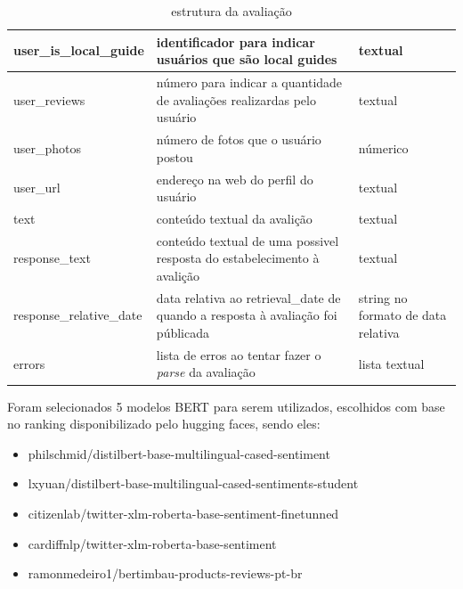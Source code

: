 \begin{table}[]
\begin{tabular}{|l|p{5cm}|p{5cm}|}
		\hline
		user\_is\_local\_guide    & identificador para indicar usuários que são local guides                        & textual                                                                        \\
		\hline
		user\_reviews             & número para indicar a quantidade de avaliações realizardas pelo usuário         & textual                                                                        \\
		\hline
		user\_photos              & número de fotos que o usuário postou                                            & númerico                                                                       \\
		\hline
		user\_url                 & endereço na web do perfil do usuário                                            & textual                                                                        \\
		\hline
		text                      & conteúdo textual da avalição                                                    & textual                                                                        \\
		\hline
		response\_text            & conteúdo textual de uma possivel resposta do estabelecimento à avalição         & textual                                                                        \\
		\hline
		response\_relative\_date  & data relativa ao retrieval\_date de quando a resposta à avaliação foi públicada & string no formato de data relativa                                             \\
		\hline
		errors                    & lista de erros ao tentar fazer o \emph{parse} da avaliação                      & lista textual                                                                  \\
		\hline
	\end{tabular}
	\caption{estrutura da avaliação}
	\label{tab:estrutura_review}
\end{table}

Foram selecionados 5 modelos BERT para serem utilizados, escolhidos com base no ranking disponibilizado pelo hugging faces, sendo eles:
\begin{itemize}
	\item philschmid/distilbert-base-multilingual-cased-sentiment
	\item lxyuan/distilbert-base-multilingual-cased-sentiments-student
	\item citizenlab/twitter-xlm-roberta-base-sentiment-finetunned
	\item cardiffnlp/twitter-xlm-roberta-base-sentiment
	\item ramonmedeiro1/bertimbau-products-reviews-pt-br
\end{itemize}

